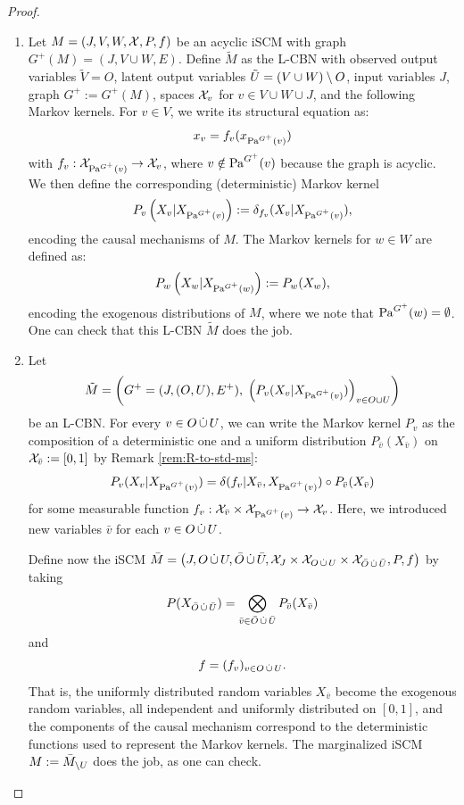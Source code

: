 \begin{proof}
  \begin{enumerate}[label=\roman*)]
    \item
      Let $M = \left ( J, V, W, \mathcal{X}, P, f \right )$ be an acyclic iSCM with graph $G^+(M) = (J, V \cup W, E)$.
      Define $\tilde{M}$ as the L-CBN with observed output variables $\tilde{V} = O$, latent output variables $\tilde{U} = (V \cup W) \setminus O$, input variables $J$, graph $G^+:=G^+(M)$, spaces $\mathcal{X}_v$ for $v \in V\cup W \cup J$, and the following Markov kernels.
      For $v \in V$, we write its structural equation as:
      $$x_v = f_v(x_{\mathrm{Pa}^{G^+}(v)})$$
      with $f_v : \mathcal{X}_{\mathrm{Pa}^{G^+}(v)} \to \mathcal{X}_v$,
      where $v \notin \mathrm{Pa}^{G^+}(v)$ because the graph is acyclic. We then define the corresponding (deterministic) Markov kernel
      \[ P_v\left ( X_v|X_{\mathrm{Pa}^{G^+}(v)}\right ) := \delta_{f_v}(X_v|X_{\mathrm{Pa}^{G^+}(v)}),\]
      encoding the causal mechanisms of $M$.
      The Markov kernels for $w \in W$ are defined as:
      \[ P_w\left ( X_w|X_{\mathrm{Pa}^{G^+}(w)}\right ) := P_w(X_w),\]
      encoding the exogenous distributions of $M$, where we note that $\mathrm{Pa}^{G^+}(w) = \emptyset$.
      One can check that this L-CBN $\tilde{M}$ does the job.
    \item
      Let 
      \[ \tilde{M} = \left ( G^+=(J,(O,U),E^+), \; \left ( P_v(X_v| X_{\mathrm{Pa}^{G^+}(v)}) \right )_{v\in O \cup U} \right ) \]
      be an L-CBN.
      For every $v \in O \,\dot{\cup}\, U$, we can write the Markov kernel $P_v$ as the composition of a deterministic one and 
      a uniform distribution $P_{\bar v}(X_{\bar v})$ on $\mathcal{X}_{\bar v}:=[0,1]$ by Remark \ref{rem:R-to-std-ms}:
        \[ P_v(X_v|X_{\mathrm{Pa}^{G^+}(v)}) = \delta(f_v|X_{\bar v}, X_{\mathrm{Pa}^{G^+}(v)}) \circ P_{\bar v}(X_{\bar v}) \]
      for some measurable function $f_v : \mathcal{X}_{\bar v} \times \mathcal{X}_{\mathrm{Pa}^{G^+}(v)} \to \mathcal{X}_v$.
      Here, we introduced new variables $\bar v$ for each $v \in O \,\dot{\cup}\, U$.

      Define now the iSCM $\bar{M} = \left ( J, O \,\dot{\cup}\, U, \bar O \,\dot{\cup}\, \bar U, \mathcal{X}_J \times \mathcal{X}_{O \,\dot{\cup}\, U} \times \mathcal{X}_{\bar O \,\dot{\cup}\, \bar U}, P, f \right )$ by taking
      $$P(X_{\bar O \,\dot{\cup}\, \bar U}) = \bigotimes_{\bar v \in \bar O \,\dot{\cup}\, \bar U} P_{\bar v}(X_{\bar v})$$
      and
      $$f = (f_v)_{v \in O \,\dot{\cup}\, U}.$$
      That is, the uniformly distributed random variables $X_{\bar v}$ become the exogenous random variables,
      all independent and uniformly distributed on $[0,1]$, and the components of the causal mechanism correspond to the deterministic functions used to represent the Markov kernels.
      The marginalized iSCM $M := \bar{M}_{\setminus U}$ does the job, as one can check.
  \end{enumerate}
\end{proof}

